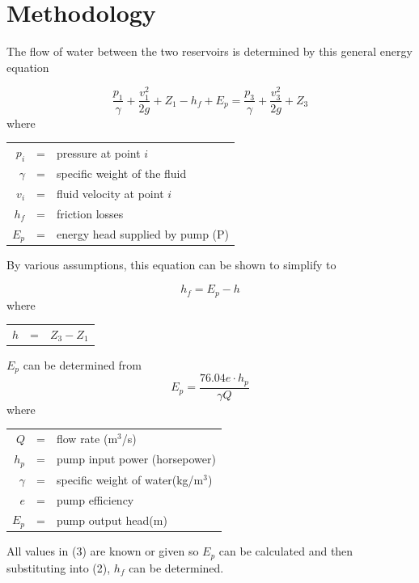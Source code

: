 \documentclass[titlepage,11pt]{article}
\begin{document}
\section {Methodology}
The flow of water between the two reservoirs is determined by this
general energy equation
\begin{singlespace}
\begin{equation}
\frac{p_1}{\gamma}+\frac{v_1^2}{2g}+Z_1-h_f+E_p=\frac{p_3}{\gamma}+\frac{v_3^2}{2g}+Z_3
\end{equation}
where

\begin{center}
\begin{tabular}{rcl}
$p_i$&=& pressure at point $i$\\
$\gamma$&=& specific weight of the fluid\\
$v_i$&=& fluid velocity at point $i$\\
$h_f$&=&friction losses\\
$E_p$&=& energy head supplied by pump (P)
\end{tabular}
\end{center}
\end{singlespace}

By various assumptions, this equation can be shown to simplify to
\begin{singlespace}
\begin{equation}
h_f=E_p-h
\end{equation}
where
\begin{center}
\begin{tabular}{rcl}
$h$&=&$Z_3-Z_1$
\end{tabular}
\end{center}
$E_p$ can be determined from
\begin{equation}
E_p=\frac{76.04e\cdot h_p}{\gamma Q}
\end{equation}
where
\begin{center}
\begin{tabular}{rcl}
$Q$&=&flow rate (m$^3$/s)\\
$h_p$&=&pump input power (horsepower)\\
$\gamma$ &=&specific weight of water(kg/m$^3$)\\
$e$&=&pump efficiency\\
$E_p$&=&pump output head(m)
\end{tabular}
\end{center}
\end{singlespace}

All values in (3) are known or given so $E_p$ can be calculated and
then substituting into (2), $h_f$ can be determined.
\end{document}
